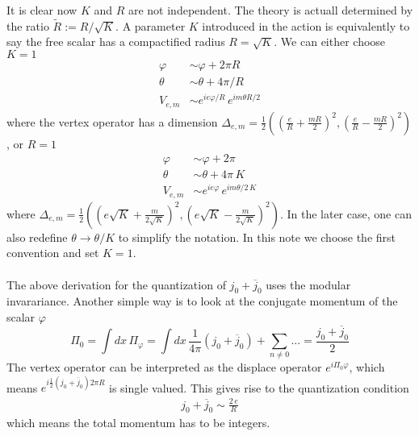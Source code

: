 \documentclass[submission, PhysLectNotes]{SciPost}
\begin{document}
It is clear now $K$ and $R$ are not independent. The theory is actuall determined by the ratio $\tilde{R} := R/\sqrt{K}$. A parameter $K$ introduced in the action is equivalently to say the free scalar has a compactified radius $R = \sqrt{K}$. We can either choose $K=1$
\begin{equation}
	\begin{aligned}
		\varphi &\sim \varphi + 2\pi R \\
		\theta &\sim \theta + 4\pi/R \\
		V_{e,m} &\sim e^{ie\varphi/R}\,e^{im\theta R/2}
	\end{aligned}
\end{equation}
where the vertex operator has a dimension $\Delta_{e,m} = \frac{1}{2}\left(\left(\frac{e}{R}+\frac{mR}{2}\right)^2,\left(\frac{e}{R}-\frac{mR}{2}\right)^2\right)$, or $R=1$
\begin{equation}
	\begin{aligned}
		\varphi &\sim \varphi + 2\pi \\
		\theta &\sim \theta + 4\pi\,K \\
		V_{e,m} &\sim e^{ie\varphi}\,e^{im\theta/2\,K}
	\end{aligned}
\end{equation}
where $\Delta_{e,m} = \frac{1}{2}\left(\left(e\sqrt{K}+\frac{m}{2\sqrt{K}}\right)^2,\left(e\sqrt{K}-\frac{m}{2\sqrt{K}}\right)^2\right)$. In the later case, one can also redefine $\theta \rightarrow \theta / K$ to simplify the notation. In this note we choose the first convention and set $K=1$. \\

 \\
 The above derivation for the quantization of $j_0 + \overline{j}_0$ uses the modular invarariance. Another simple way is to look at the conjugate momentum of the scalar $\varphi$
 \begin{equation}
	\Pi_0 = \int dx \, \Pi_\varphi = \int dx \, \frac{1}{4\pi} \left(j_0 + \overline{j}_0\right) + \sum_{n\neq0}... = \frac{j_0+\overline{j}_0}{2}
 \end{equation} 
The vertex operator can be interpreted as the displace operator $e^{i\Pi_0 \varphi}$, which means $e^{i\frac{1}{2}\left(j_0+\overline{j}_0\right)2\pi R}$ is single valued. This gives rise to the quantization condition
\begin{equation}
	\begin{aligned}
		j_0 + \overline{j}_0 \sim \frac{2\,e}{R}
	\end{aligned}
\end{equation}
which means the total momentum has to be integers.
\end{document}
